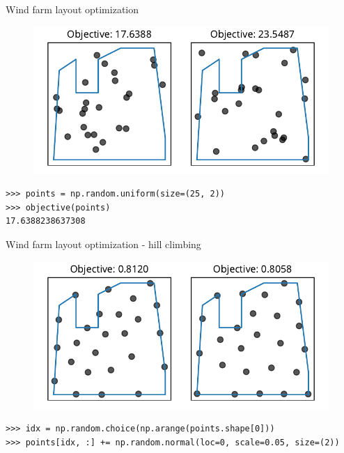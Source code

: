 \documentclass[12pt, aspectratio=149]{beamer}
\theoremstyle{plain}
\begin{document}
\begin{frame}[fragile]{Wind farm layout optimization}
\vspace*{-1em}
\begin{center}
 \begin{figure}
    	\centering
    	\includegraphics[width=0.99\linewidth]{figures/windfarm_random_solution}
 \end{figure}
 \end{center}
\vspace*{-2em}
\begin{center}
\begin{verbatim}
>>> points = np.random.uniform(size=(25, 2))
>>> objective(points)
17.6388238637308
\end{verbatim}
\end{center}
\end{frame}

\begin{frame}[fragile]{Wind farm layout optimization - hill climbing}
\vspace*{-1em}
\begin{center}
 \begin{figure}
    	\centering
    	\includegraphics[width=0.99\linewidth]{figures/windfarm_hc}
 \end{figure}
 \end{center}
\vspace*{-2em}
\begin{center}
\begin{verbatim}
>>> idx = np.random.choice(np.arange(points.shape[0]))
>>> points[idx, :] += np.random.normal(loc=0, scale=0.05, size=(2))
\end{verbatim}
\end{center}
\end{frame}
\end{document}
